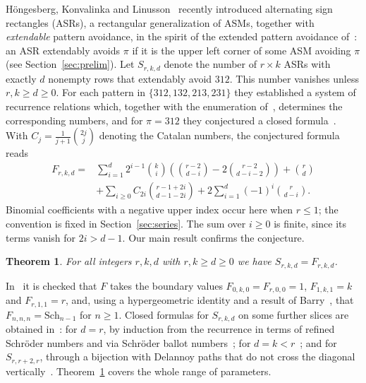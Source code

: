 \documentclass{amsart}
\newtheorem{theorem}{Theorem}[section]
\theoremstyle{definition}
\theoremstyle{remark}
\numberwithin{equation}{section}
\newcommand{\Sch}{\mathrm{Sch}}
\begin{document}
H\"ongesberg, Konvalinka and Linusson~\cite{HKL} recently introduced alternating sign rectangles (ASRs), a rectangular generalization of ASMs, together with \emph{extendable} pattern avoidance, in the spirit of the extended pattern avoidance of~\cite{EL95,Lin02}: an ASR extendably avoids $\pi$ if it is the upper left corner of some ASM avoiding $\pi$ (see Section~\ref{sec:prelim}). Let $S_{r,k,d}$ denote the number of $r\times k$ ASRs with exactly $d$ nonempty rows that extendably avoid $312$. This number vanishes unless $r,k\ge d\ge 0$. For each pattern in $\{312,132,213,231\}$ they established a system of recurrence relations which, together with the enumeration of~\cite{JL07}, determines the corresponding numbers, and for $\pi=312$ they conjectured a closed formula~\cite[Conjecture~4.5]{HKL}. With $C_j=\frac{1}{j+1}\binom{2j}{j}$ denoting the Catalan numbers, the conjectured formula reads
\begin{equation}\label{eq:F}
\begin{aligned}
F_{r,k,d}={}&\sum_{i=1}^{d}2^{i-1}\binom{k}{i}\left(\binom{r-2}{d-i}-2\binom{r-2}{d-i-2}\right)+\binom{r}{d}\\
&+\sum_{i\ge0}C_{2i}\binom{r-1+2i}{d-1-2i}+2\sum_{i=1}^{d}(-1)^i\binom{r}{d-i}.
\end{aligned}
\end{equation}
Binomial coefficients with a negative upper index occur here when $r\le1$; the convention is fixed in Section~\ref{sec:series}. The sum over $i\ge0$ is finite, since its terms vanish for $2i>d-1$. Our main result confirms the conjecture.

\begin{theorem}\label{thm:main}
For all integers $r,k,d$ with $r,k\ge d\ge0$ we have $S_{r,k,d}=F_{r,k,d}$.
\end{theorem}

In~\cite[p.~9]{HKL} it is checked that $F$ takes the boundary values $F_{0,k,0}=F_{r,0,0}=1$, $F_{1,k,1}=k$ and $F_{r,1,1}=r$, and, using a hypergeometric identity and a result of Barry~\cite{Bar21}, that $F_{n,n,n}=\Sch_{n-1}$ for $n\ge1$. Closed formulas for $S_{r,k,d}$ on some further slices are obtained in~\cite[Section~5]{HKL}: for $d=r$, by induction from the recurrence in terms of refined Schr\"oder numbers and via Schr\"oder ballot numbers~\cite[Theorems~5.1 and~5.2, Corollary~5.3]{HKL}; for $d=k<r$~\cite[Corollary~5.4]{HKL}; and for $S_{r,r+2,r}$, through a bijection with Delannoy paths that do not cross the diagonal vertically~\cite[Theorem~5.5 and Corollary~5.6]{HKL}. Theorem~\ref{thm:main} covers the whole range of parameters.
\end{document}
